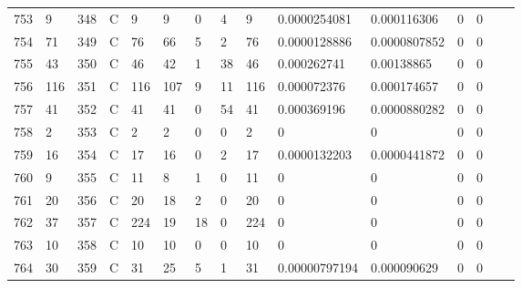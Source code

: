 \begin{longtable}{lllllllllllllll}
	753 & 9                 & 348 & C   & 9                 & 9                 & 0                 & 4    & 9          & 0.0000254081   & 0.000116306    & 0             & 0            \\
	754 & 71                & 349 & C   & 76                & 66                & 5                 & 2    & 76         & 0.0000128886   & 0.0000807852   & 0             & 0            \\
	755 & 43                & 350 & C   & 46                & 42                & 1                 & 38   & 46         & 0.000262741    & 0.00138865     & 0             & 0            \\
	756 & 116               & 351 & C   & 116               & 107               & 9                 & 11   & 116        & 0.000072376    & 0.000174657    & 0             & 0            \\
	757 & 41                & 352 & C   & 41                & 41                & 0                 & 54   & 41         & 0.000369196    & 0.0000880282   & 0             & 0            \\
	758 & 2                 & 353 & C   & 2                 & 2                 & 0                 & 0    & 2          & 0              & 0              & 0             & 0            \\
	759 & 16                & 354 & C   & 17                & 16                & 0                 & 2    & 17         & 0.0000132203   & 0.0000441872   & 0             & 0            \\
	760 & 9                 & 355 & C   & 11                & 8                 & 1                 & 0    & 11         & 0              & 0              & 0             & 0            \\
	761 & 20                & 356 & C   & 20                & 18                & 2                 & 0    & 20         & 0              & 0              & 0             & 0            \\
	762 & 37                & 357 & C   & 224               & 19                & 18                & 0    & 224        & 0              & 0              & 0             & 0            \\
	763 & 10                & 358 & C   & 10                & 10                & 0                 & 0    & 10         & 0              & 0              & 0             & 0            \\
	764 & 30                & 359 & C   & 31                & 25                & 5                 & 1    & 31         & 0.00000797194  & 0.000090629    & 0             & 0            \\

\end{longtable}
